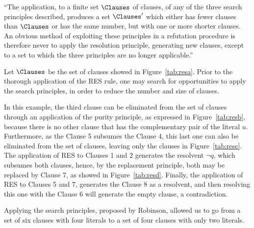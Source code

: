 ``The application, to a finite set $\Clauses$ of clauses, of any of the three
search principles described, produces a set $\Clauses'$ which either has fewer
clauses than $\Clauses$ or has the same number, but with one or more shorter
clauses. An obvious method of exploiting these principles in a
refutation procedure is therefore never to apply the resolution principle,
generating new clauses, except to a set to which the three principles are no
longer applicable.''~\cite{Robinson65} 

\begin{example}
    Let $\Clauses$ be the set of clauses showed in Figure~\ref{tab:resa}. Prior
    to the thorough application of the RES rule, one may search for
    opportunities to apply the search principles, in order to reduce the
    number and size of clauses.

    In this example, the third clause can be eliminated from the set of clauses
    through an application of the purity principle, as expressed in
    Figure~\ref{tab:resb}, because there is no other clause that has the
    complementary pair of the literal $u$. 
    Furthermore, as the Clause 5 subsumes the Clause 4, this last one can also
    be eliminated from the set of clauses, leaving only the clauses in
    Figure~\ref{tab:resc}.
    The application of RES to Clauses 1 and 2 generates the resolvent
    $\neg q$, which subsumes both clauses, hence, by the replacement principle,
    both may be replaced by Clause 7, as showed in Figure~\ref{tab:resd}.
    Finally, the application of RES to Clauses 5 and 7, generates the Clause
    8 as a resolvent, and then resolving this one with the Clause 6 will
    generate the empty clause, a contradiction. 

    Applying the search principles, proposed by Robinson, allowed us to go from
    a set of six clauses with four literals to a set of four clauses with only
    two literals.


\end{example}
